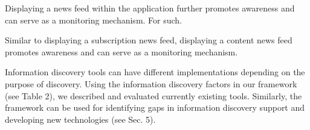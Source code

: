 {{{Displaying a news feed within the application further promotes awareness and can serve as a monitoring mechanism. For such. 

Similar to displaying a subscription news feed, displaying a content news feed promotes awareness and can serve as a monitoring mechanism.

Information discovery tools can have different implementations depending on the purpose of discovery. Using the information discovery factors in our framework (see Table 2), we described and evaluated currently existing tools. Similarly, the framework can be used for identifying gaps in information discovery support and developing new technologies (see Sec. 5).   \\

} %





} %


}










